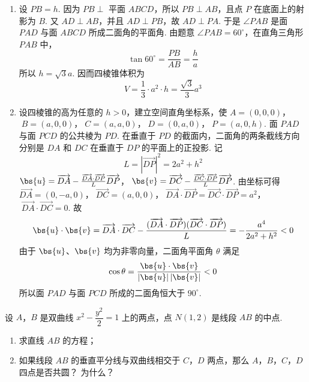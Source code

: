 \begin{solution}
\begin{enumerate}
\item 设 \(PB=h\). 因为 \(PB\perp\) 平面 \(ABCD\)，所以 \(PB\perp AB\)，且点 \(P\) 在底面上的射影为 \(B\). 又 \(AD\perp AB\)，并且 \(AD\perp PB\)，故 \(AD\perp PA\). 于是 \(\angle PAB\) 是面 \(PAD\) 与面 \(ABCD\) 所成二面角的平面角. 由题意 \(\angle PAB=60^{\circ}\)，在直角三角形 \(PAB\) 中，
\[
\tan60^{\circ}=\frac{PB}{AB}=\frac{h}{a}
\]
所以 \(h=\sqrt3a\). 因而四棱锥体积为
\[
V=\frac13\cdot a^2\cdot h=\frac{\sqrt3}{3}a^3
\]

\item 设四棱锥的高为任意的 \(h>0\)，建立空间直角坐标系，使
\(A=(0,0,0)\)，\(\; B=(a,0,0)\)，\(\; C=(a,a,0)\)，\(\; D=(0,a,0)\)，\(\; P=(a,0,h)\).
面 \(PAD\) 与面 \(PCD\) 的公共棱为 \(PD\). 在垂直于 \(PD\) 的截面内，二面角的两条截线方向分别是 \(DA\) 和 \(DC\) 在垂直于 \(DP\) 的平面上的正投影. 记
\[
L=|\overrightarrow{DP}|^2=2a^2+h^2
\]
\(\bs{u}=\overrightarrow{DA}-\frac{\overrightarrow{DA}\cdot\overrightarrow{DP}}{L}\overrightarrow{DP}\)，\(\; \bs{v}=\overrightarrow{DC}-\frac{\overrightarrow{DC}\cdot\overrightarrow{DP}}{L}\overrightarrow{DP}\).
由坐标可得
\(\overrightarrow{DA}=(0,-a,0)\)，\(\; \overrightarrow{DC}=(a,0,0)\)，\(\; \overrightarrow{DA}\cdot\overrightarrow{DP}=\overrightarrow{DC}\cdot\overrightarrow{DP}=a^2\)，\(\; \overrightarrow{DA}\cdot\overrightarrow{DC}=0\).
故
\[
\bs{u}\cdot\bs{v}=\overrightarrow{DA}\cdot\overrightarrow{DC}
-\frac{(\overrightarrow{DA}\cdot\overrightarrow{DP})(\overrightarrow{DC}\cdot\overrightarrow{DP})}{L}
=-\frac{a^4}{2a^2+h^2}<0
\]
由于 \(\bs{u}\)、\(\bs{v}\) 均为非零向量，二面角平面角 \(\theta\) 满足
\[
\cos\theta=\frac{\bs{u}\cdot\bs{v}}{|\bs{u}|\,|\bs{v}|}<0
\]
所以面 \(PAD\) 与面 \(PCD\) 所成的二面角恒大于 \(90^{\circ}\).
\end{enumerate}
\end{solution}

\begin{problem}
设 \(A\)，\(B\) 是双曲线 \(x^{2} - \dfrac{y^{2}}{2} = 1\) 上的两点，点 \(N(1,2)\) 是线段 \(AB\) 的中点.

\begin{enumerate}
\item 求直线 \(AB\) 的方程；
\item 如果线段 \(AB\) 的垂直平分线与双曲线相交于 \(C\)，\(D\) 两点，那么 \(A\)，\(B\)，\(C\)，\(D\) 四点是否共圆？ 为什么？
\end{enumerate}
\end{problem}

